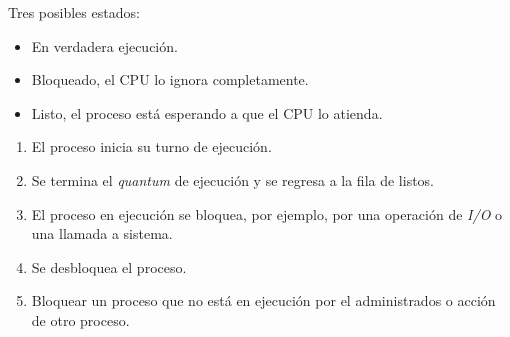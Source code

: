 Tres posibles estados:
\begin{itemize}
	\item En verdadera ejecuci\'{o}n.
	\item Bloqueado, el CPU lo ignora completamente.
	\item Listo, el proceso est\'{a} esperando a que el CPU lo atienda.
\end{itemize}
\begin{enumerate}
	\item El proceso inicia su turno de ejecuci\'{o}n.
	\item Se termina el \textit{quantum} de ejecuci\'{o}n y se regresa a la fila de listos.
	\item El proceso en ejecuci\'{o}n se bloquea, por ejemplo, por una operaci\'{o}n de \textit{I/O} o una llamada a sistema.
	\item Se desbloquea el proceso.
	\item Bloquear un proceso que no est\'{a} en ejecuci\'{o}n por el administrados o acci\'{o}n de otro proceso.
\end{enumerate}

